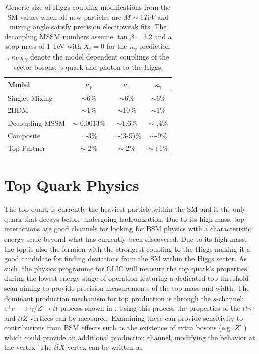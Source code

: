 \begin{table}
  \centering
  \begin{tabular}{l c c c}
    \toprule
    \toprule
    Model  & $\kappa_V$ & $\kappa_b$ & $\kappa_\gamma$  \\
    \midrule
    Singlet Mixing & $\sim$6\% & $\sim$6\%  & $\sim$6\% \\
    2HDM & $\sim$1\% & $\sim$10\%  & $\sim$1\% \\
    Decoupling MSSM & $\sim$-0.0013\% & $\sim$1.6\%  & $\sim$-.4\% \\
    Composite & $\sim$-3\% & $\sim$-(3-9)\%  & $\sim$-9\% \\
    Top Partner & $\sim$-2\% & $\sim$-2\%  & $\sim$+1\% \\
    \bottomrule
    \bottomrule
  \end{tabular}
  \caption[Predicted Higgs Coupling Modifications for BSM theories]{Generic size of Higgs coupling modifications from the \ac{SM} values when all new particles are $M\sim 1 TeV$ and mixing angle satisfy precision electroweak fits. The decoupling MSSM numbers assume $\tan\beta = 3.2$ and a stop mass of 1 TeV with $X_t =0$ for the $\kappa_\gamma$ prediction \cite{Dawson:2013bba}. $\kappa_{V,b,\gamma}$ denote the model dependent couplings of the vector bosons, b quark and photon to the Higgs.}
  \label{table:snowmass}
\end{table}

\section{Top Quark Physics}


The top quark is currently the heaviest particle within the \ac{SM} and is the only quark that decays before undergoing hadronization. Due to its high mass, top interactions are good channels for looking for \ac{BSM} physics with a characteristic energy scale beyond what has currently been discovered. Due to its high mass, the top is also the fermion with the strongest coupling to the Higgs making it a good candidate for finding deviations from the \ac{SM} within the Higgs sector. As such, the physics programme for \ac{CLIC} will measure the top quark's properties during the lowest energy stage of operation featuring a dedicated top threshold scan aiming to provide precision measurements of the top mass and width. The dominant production mechanism for top production is through the $s$-channel: $e^+e^-\rightarrow\gamma /Z\rightarrow t\bar{t}$ process shown in . Using this process the properties of the $t\bar{t}\gamma$ and $t\bar{t}Z$ vertices can be measured. Examining these can provide sensitivity to contributions from \ac{BSM} effects such as the existence of extra bosons (e.g. $Z'$ \cite{Langacker:2008yv}) which could provide an additional production channel, modifying the behavior at the vertex. The  $t\bar{t}X$ vertex can be written as\cite{Amjad:2015mma}

